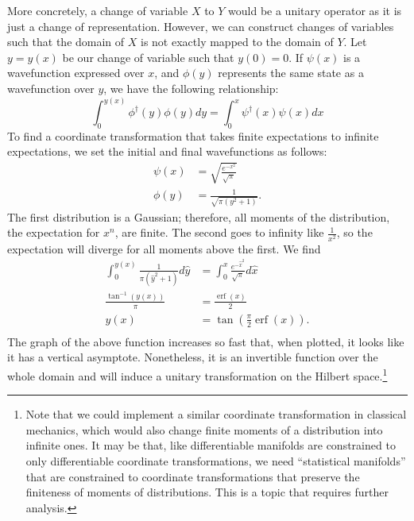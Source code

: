 \documentclass[10pt,twocolumn, nofootinbib]{revtex4-2}
\DeclareMathOperator{\erf}{erf}
\begin{document}
More concretely, a change of variable $X$ to $Y$ would be a unitary operator as it is just a change of representation. However, we can construct changes of variables such that the domain of $X$ is not exactly mapped to the domain of $Y$. Let $y=y(x)$ be our change of variable such that $y(0) = 0$. If $\psi(x)$ is a wavefunction expressed over $x$, and $\phi(y)$ represents the same state as a wavefunction over $y$, we have the following relationship:
\begin{equation}
\int_{0}^{y(x)} \phi^\dagger(y) \phi(y) dy = \int_{0}^{x} \psi^\dagger(x) \psi(x) dx
\end{equation}
To find a coordinate transformation that takes finite expectations to infinite expectations, we set the initial and final wavefunctions as follows:
\begin{align}
\psi(x) &= \sqrt{\frac{e^{-x^2}}{\sqrt{\pi}}} \\
\phi(y) &= \frac{1}{\sqrt{\pi(y^2 + 1)}}.
\end{align}
The first distribution is a Gaussian; therefore, all moments of the distribution, the expectation for $x^n$, are finite. The second goes to infinity like $\frac{1}{x^2}$, so the expectation will diverge for all moments above the first. We find
\begin{equation}
\begin{aligned}
\int_{0}^{y(x)} \frac{1}{\pi(\hat{y}^2 + 1)} d\hat{y} &= \int_{0}^{x} \frac{e^{-\hat{x}^2}}{\sqrt{\pi}} d\hat{x} \\
\frac{\tan^{-1}(y(x))}{\pi} &= \frac{\erf(x)}{2} \\
y(x) &= \tan \left(\frac{\pi}{2}\erf(x)\right). \\
\end{aligned}
\end{equation}
The graph of the above function increases so fast that, when plotted, it looks like it has a vertical asymptote. Nonetheless, it is an invertible function over the whole domain and will induce a unitary transformation on the Hilbert space.\footnote{Note that we could implement a similar coordinate transformation in classical mechanics, which would also change finite moments of a distribution into infinite ones. It may be that, like differentiable manifolds are constrained to only differentiable coordinate transformations, we need ``statistical manifolds'' that are constrained to coordinate transformations that preserve the finiteness of moments of distributions. This is a topic that requires further analysis.}
\end{document}
